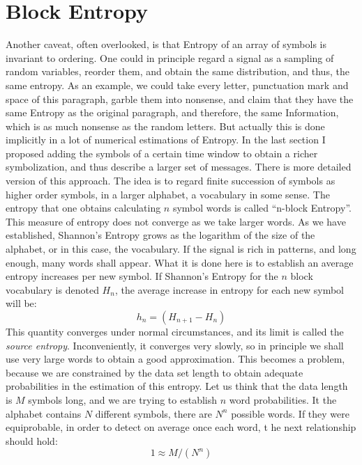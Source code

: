 \documentclass[10pt]{article}
\begin{document}
\section{Block Entropy}

Another caveat, often overlooked, is that Entropy of an array of symbols is invariant to ordering. One could in principle regard a signal as a sampling of random variables, reorder them, and obtain the same distribution, and thus, the same entropy. As an example, we could take every letter, punctuation mark and space of this paragraph, garble them into nonsense, and claim that they have the same Entropy as the original paragraph, and therefore, the same Information, which is as much nonsense as the random letters. But actually this is done implicitly in a lot of numerical estimations of Entropy. In the last section
I proposed adding the symbols of a certain time window to obtain a richer symbolization,
and thus describe a larger set of messages. There is more detailed version
of this approach. The idea is to regard finite succession of symbols as
higher order symbols, in a larger alphabet, a vocabulary in some sense. The entropy
that one obtains calculating $n$ symbol words is called ``n-block Entropy''.
This measure of entropy does not converge as we take larger words. As we have
established, Shannon's Entropy grows as the logarithm of the size of the
alphabet, or in this case, the vocabulary. If the signal is rich in patterns, and
long enough, many words shall appear. What it is done here is to establish
an average entropy increases per new symbol. If Shannon's Entropy for the $n$ block
vocabulary is denoted $H_n$, the average increase in entropy for each new symbol
will be:
\begin{equation}
    h_n=(H_{n+1}-H_n)    
\end{equation}
This quantity converges under normal circumstances, and its limit is called
the \emph{source entropy}. Inconveniently, it converges very slowly, so in principle
we shall use very large words to obtain a good approximation. This becomes a
problem, because we are constrained by the data set length to obtain adequate
probabilities in the estimation of this entropy. Let us
think that the data length is $M$ symbols
long, and we are trying to establish $n$ word probabilities. It the alphabet
contains $N$ different symbols, there are $N^n$ possible words. If they were
equiprobable, in order to detect on average once each word, t
he next relationship should hold:
\begin{equation}
  1 \approx M/(N^n)
\end{equation}
\end{document}
